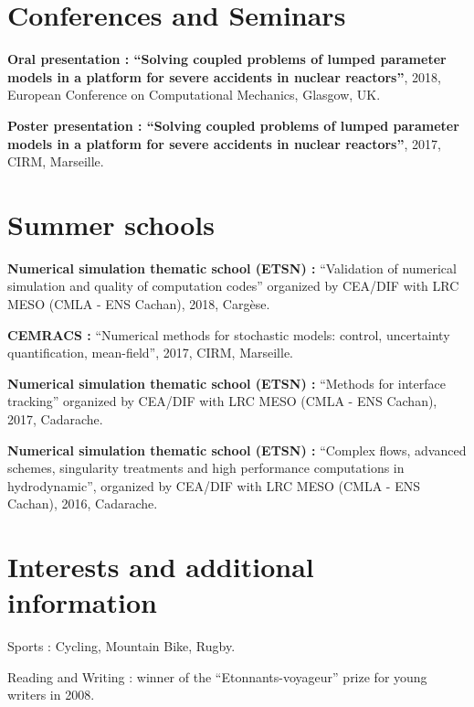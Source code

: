 \documentclass{article}
\renewenvironment{itemize}{
  \begin{list}{}{
      \setlength{\leftmargin}{1.5em}
      \setlength{\itemsep}{0.25em}
      \setlength{\parskip}{0pt}
      \setlength{\parsep}{0.25em}
    }
}{
  \end{list}
}
\begin{document}
\section*{Conferences and Seminars}
\begin{itemize}
	\item \textbf{Oral presentation : ``Solving coupled problems of lumped parameter models in a platform for severe accidents in nuclear reactors''}, 2018, European Conference on Computational Mechanics, Glasgow, UK.
	\item \textbf{Poster presentation : ``Solving coupled problems of lumped parameter models in a platform for severe accidents in nuclear reactors''}, 2017, CIRM, Marseille.
\end{itemize}  

\section*{Summer schools}
\begin{itemize}
	\item \textbf{Numerical simulation thematic school (ETSN) :} ``Validation of numerical simulation and quality of computation codes'' organized by CEA/DIF with LRC MESO (CMLA - ENS Cachan), 2018, Cargèse.
	\item \textbf{CEMRACS :} ``Numerical methods for stochastic models: control, uncertainty quantification, mean-field'', 2017, CIRM, Marseille.
	\item \textbf{Numerical simulation thematic school (ETSN) :} ``Methods for interface tracking'' organized by CEA/DIF with LRC MESO (CMLA - ENS Cachan), 2017, Cadarache.
	\item \textbf{Numerical simulation thematic school (ETSN) :} ``Complex flows, advanced schemes, singularity treatments and high performance computations in hydrodynamic'', organized by CEA/DIF with LRC MESO (CMLA - ENS Cachan), 2016, Cadarache.
\end{itemize}  

\section*{Interests and additional information}
\begin{itemize}
	\item Sports : Cycling, Mountain Bike, Rugby.
	\item Reading and Writing : winner of the ``Etonnants-voyageur'' prize for young writers in 2008.
\end{itemize}  
\end{document}
